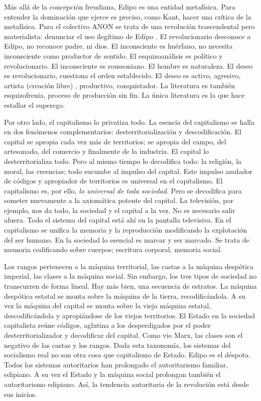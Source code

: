 Más allá de la concepción freudiana, Edipo es una entidad metafísica. Para entender la dominación que ejerce es preciso, como Kant, hacer una crítica de la metafísica. Para el colectivo ANON se trata de una revolución trascendental pero materialista: denunciar el uso ilegítimo de Edipo \autocite{AltWokeCompanion2017}. El revolucionario desconoce a Edipo, no reconoce padre, ni dios. El inconsciente es huérfano, no necesita inconsciente como productor de sentido. El esquizoanálisis es político y revolucionario. El inconsciente es roussoniano. El hombre es naturaleza. El deseo es revolucionario, cuestiona el orden establecido. El deseo es activo, agresivo, artista (creación libre) , productivo, conquistador. La literatura es también esquizofrenia, proceso de producción sin fin. La única literatura es la que hace estallar el superego.

Por otro lado, el capitalismo lo privatiza todo. La esencia del capitalismo se halla en dos fenómenos complementarios: desterritorialización y descodificación. El capital se apropia cada vez más de territorios; se apropia del campo, del artesanado, del comercio y finalmente de la industria. El capital lo desterritorializa todo. Pero al mismo tiempo lo decodifica todo: la religión, la moral, las creencias; todo sucumbe al impulso del capital. Este impulso anulador de códigos y apropiador de territorios es universal en el capitalismo. El capitalismo es, por ello, \emph{lo universal de toda sociedad}. Pero se decodifica para someter nuevamente a la axiomática potente del capital. La televisión, por ejemplo, nos da todo, la sociedad y el capital a la vez. No es necesario salir afuera. Todo el sistema del capital está ahí en la pantalla televisiva. En el capitalismo se unifica la memoria y la reproducción modificando la explotación del ser humano. En la sociedad lo esencial es marcar y ser marcado. Se trata de memoria codificando sobre cuerpos; escritura corporal, memoria social.

Los rangos pertenecen a la máquina territorial, las castas a la máquina despótica imperial, las clases a la máquina social. Sin embargo, los tres tipos de sociedad no transcurren de forma lineal. Hay más bien, una secuencia de estratos. La máquina despótica estatal se monta sobre la máquina de la tierra, recodificándola. A su vez la máquina del capital se monta sobre la vieja máquina estatal, descodificándola y apropiándose de los viejos territorios. El Estado en la sociedad capitalista reúne códigos, aglutina a los desperdigados por el poder desterritorializador y decodificar del capital. Como vio Marx, las clases son el negativo de las castas y los rangos. Dada esta taxonomía, los sistemas del socialismo real no son otra cosa que capitalismo de Estado. Edipo es el déspota. Todos los sistemas autoritarios han prolongado el autoritarismo familiar, edipiano. A su vez el Estado y la máquina social prolongan también el autoritarismo edipiano. Así, la tendencia autoritaria de la revolución está desde sus inicios.


